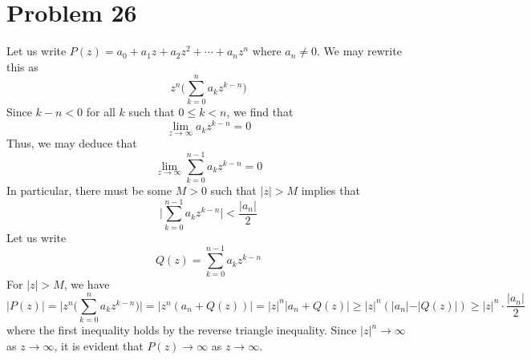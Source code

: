 \documentclass[12pt]{article}
\begin{document}
\section*{Problem 26}
Let us write $P(z) = a_0 + a_1z + a_2z^2 + \cdots + a_nz^n$ where $a_n \neq 0$. We may rewrite this as 
\[
z^n\bigg(\sum_{k=0}^n a_kz^{k-n}\bigg)
\] Since $k - n < 0$ for all $k$ such that $0 \leq k < n$, we find that
\[
\lim_{z\rightarrow \infty} a_k z^{k-n} = 0 
\] Thus, we may deduce that
\[
\lim_{z\rightarrow \infty} \sum_{k=0}^{n-1} a_k z^{k-n} = 0
\] In particular, there must be some $M>0$ such that $\vert z\vert > M$ implies that 
\[
\bigg\vert \sum_{k=0}^{n-1} a_k z^{k-n} \bigg\vert < \frac{\vert a_n \vert}{2} 
\] Let us write
\[
Q(z) = \sum_{k=0}^{n-1} a_k z^{k-n}
\] 
For $\vert z\vert > M$, we have
\[
\vert P(z) \vert = \bigg \vert z^n\bigg(\sum_{k=0}^n a_kz^{k-n}\bigg) \bigg \vert =   \vert z^n(a_n + Q(z)) \vert = \vert z \vert^n \vert a_n + Q(z) \vert \geq \vert z \vert^n (\vert a_n \vert - \vert Q(z) \vert) \geq \vert z\vert^n \cdot \frac{\vert a_n \vert}{2} 
\] where the first inequality holds by the reverse triangle inequality. Since $\vert z \vert^n \rightarrow \infty$ as $z \rightarrow \infty$, it is evident that $P(z) \rightarrow \infty$ as $z \rightarrow \infty$.
\newpage
\end{document}

